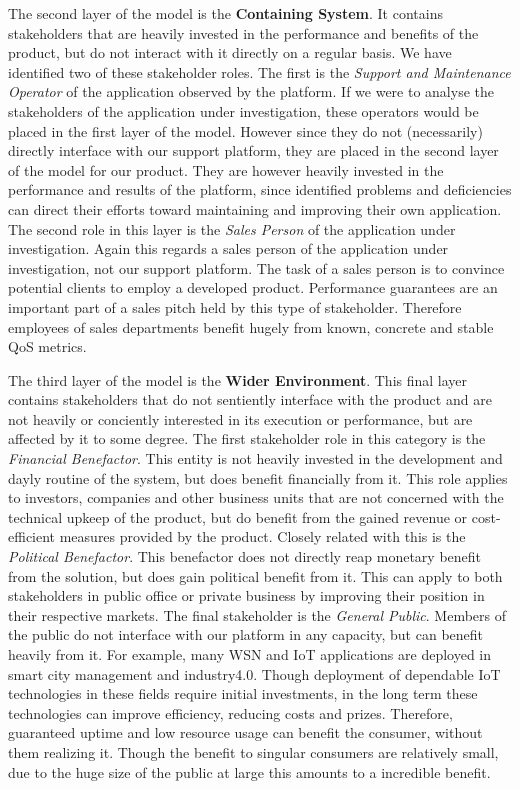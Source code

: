The second layer of the model is the \textbf{Containing System}. It contains stakeholders that are heavily invested in the performance and benefits of the product, but do not interact with it directly on a regular basis. We have identified two of these stakeholder roles. The first is the \emph{Support and Maintenance Operator} of the application observed by the platform. If we were to analyse the stakeholders of the application under investigation, these operators would be placed in the first layer of the model. However since they do not (necessarily) directly interface with our support platform, they are placed in the second layer of the model for our product. They are however heavily invested in the performance and results of the platform, since identified problems and deficiencies can direct their efforts toward maintaining and improving their own application. The second role in this layer is the \emph{Sales Person} of the application under investigation. Again this regards a sales person of the application under investigation, not our support platform. The task of a sales person is to convince potential clients to employ a developed product. Performance guarantees are an important part of a sales pitch held by this type of stakeholder. Therefore employees of sales departments benefit hugely from known, concrete and stable QoS metrics.

The third layer of the model is the \textbf{Wider Environment}. This final layer contains stakeholders that do not sentiently interface with the product and are not heavily or conciently interested in its execution or performance, but are affected by it to some degree. The first stakeholder role in this category is the \emph{Financial Benefactor}. This entity is not heavily invested in the development and dayly routine of the system, but does benefit financially from it. This role applies to investors, companies and other business units that are not concerned with the technical upkeep of the product, but do benefit from the gained revenue or cost-efficient measures provided by the product. Closely related with this is the \emph{Political Benefactor}. This benefactor does not directly reap monetary benefit from the solution, but does gain political benefit from it. This can apply to both stakeholders in public office or private business by improving their position in their respective markets. The final stakeholder is the \emph{General Public}. Members of the public do not interface with our platform in any capacity, but can benefit heavily from it. For example, many WSN and IoT applications are deployed in smart city management and industry4.0\cite{voorbeelden}. Though deployment of dependable IoT technologies in these fields require initial investments, in the long term these technologies can improve efficiency, reducing costs and prizes. Therefore, guaranteed uptime and low resource usage can benefit the consumer, without them realizing it. Though the benefit to singular consumers are relatively small, due to the huge size of the public at large this amounts to a incredible benefit.

